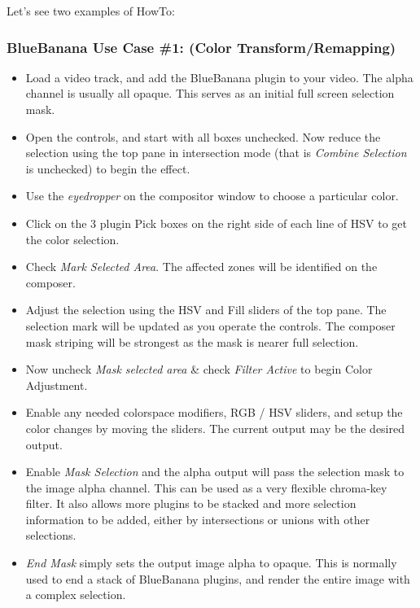 Let's see two examples of HowTo:


\subsubsection*{BlueBanana Use Case \#1: (Color Transform/Remapping)}
\label{ssub:bb_use_case_1}

\begin{itemize}
        \item Load a video track, and add the BlueBanana plugin to your video. The alpha channel is usually all opaque. This serves as an initial full screen selection mask.
        \item Open the controls, and start with all boxes unchecked. Now reduce the selection using the top pane in intersection mode (that is \textit{Combine Selection} is unchecked) to begin the effect.
        \item Use the \textit{eyedropper} on the compositor window to choose a particular color.
        \item Click on the 3 plugin Pick boxes on the right side of each line of HSV to get the color selection.
        \item Check \textit{Mark Selected Area}. The affected zones will be identified on the composer.
        \item Adjust the selection using the HSV and Fill sliders of the top pane. The selection mark will be updated as you operate the controls. The composer mask striping will be strongest as the mask is nearer full selection.
        \item Now uncheck \textit{Mask selected area} \& check \textit{Filter Active} to begin Color Adjustment.
        \item Enable any needed colorspace modifiers, RGB / HSV sliders, and setup the color changes by moving the sliders. The current output may be the desired output.
        \item Enable \textit{Mask Selection} and the alpha output will pass the selection mask to the image alpha channel. This can be used as a very flexible chroma-key filter. It also allows more plugins to be stacked and more selection information to be added, either by intersections or unions with other selections.
        \item \textit{End Mask} simply sets the output image alpha to opaque. This is normally used to end a stack of BlueBanana plugins, and render the entire image with a complex selection.
\end{itemize}


